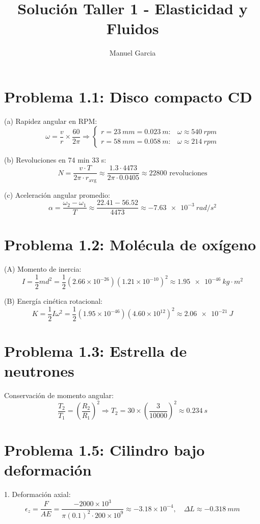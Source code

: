 \documentclass{article}
\title{Solución Taller 1 - Elasticidad y Fluidos}
\author{Manuel Garcia}
\date{}
\begin{document}
\maketitle

\section*{Problema 1.1: Disco compacto CD}
(a) Rapidez angular en RPM:
\[
\omega = \frac{v}{r} \times \frac{60}{2\pi} \Rightarrow
\begin{cases}
r = \SI{23}{mm} = \SI{0.023}{m}: & \omega \approx \SI{540}{rpm} \\
r = \SI{58}{mm} = \SI{0.058}{m}: & \omega \approx \SI{214}{rpm}
\end{cases}
\]

(b) Revoluciones en 74 min 33 s:
\[
N = \frac{v \cdot T}{2\pi \cdot r_{\text{avg}}} \approx \frac{1.3 \cdot 4473}{2\pi \cdot 0.0405} \approx \boxed{22800 \text{ revoluciones}}
\]

(c) Aceleración angular promedio:
\[
\alpha = \frac{\omega_2 - \omega_1}{T} \approx \frac{22.41 - 56.52}{4473} \approx \boxed{\SI{-7.63e-3}{rad/s^2}}
\]

\section*{Problema 1.2: Molécula de oxígeno}
(A) Momento de inercia:
\[
I = \frac{1}{2} m d^2 = \frac{1}{2} (2.66 \times 10^{-26})(1.21 \times 10^{-10})^2 \approx \boxed{\SI{1.95e-46}{kg\cdot m^2}}
\]

(B) Energía cinética rotacional:
\[
K = \frac{1}{2} I \omega^2 = \frac{1}{2}(1.95 \times 10^{-46})(4.60 \times 10^{12})^2 \approx \boxed{\SI{2.06e-21}{J}}
\]

\section*{Problema 1.3: Estrella de neutrones}
Conservación de momento angular:
\[
\frac{T_2}{T_1} = \left(\frac{R_2}{R_1}\right)^2 \Rightarrow T_2 = 30 \times \left(\frac{3}{10000}\right)^2 \approx \boxed{\SI{0.234}{s}}
\]

\section*{Problema 1.5: Cilindro bajo deformación}
1. Deformación axial:
\[
\epsilon_z = \frac{F}{A E} = \frac{-2000 \times 10^3}{\pi (0.1)^2 \cdot 200 \times 10^9} \approx \boxed{-3.18 \times 10^{-4}}, \quad \Delta L \approx \boxed{\SI{-0.318}{mm}}
\]
\end{document}

